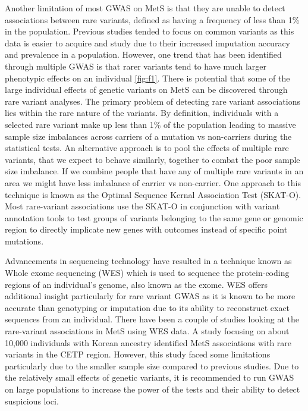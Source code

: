\documentclass[11pt]{article}
\begin{document}
Another limitation of most GWAS on MetS is that they are unable to detect associations between rare variants, defined as having a frequency of less than 1\% in the population. Previous studies tended to focus on common variants as this data is easier to acquire and study due to their increased imputation accuracy and prevalence in a population. However, one trend that has been identified through multiple GWAS is that rarer variants tend to have much larger phenotypic effects on an individual \ref{fig:f1}. There is potential that some of the large individual effects of genetic variants on MetS can be discovered through rare variant analyses. The primary problem of detecting rare variant associations lies within the rare nature of the variants. By definition, individuals with a selected rare variant make up less than 1\% of the population leading to massive sample size imbalances across carriers of a mutation vs non-carriers during the statistical tests. An alternative approach is to pool the effects of multiple rare variants, that we expect to behave similarly, together to combat the poor sample size imbalance. If we combine people that have any of multiple rare variants in an area we might have less imbalance of carrier vs non-carrier. One approach to this technique is known as the Optimal Sequence Kernal Association Test (SKAT-O). Most rare-variant associations use the SKAT-O in conjunction with variant annotation tools to test groups of variants belonging to the same gene or genomic region to directly implicate new genes with outcomes instead of specific point mutations. 

Advancements in sequencing technology have resulted in a technique known as Whole exome sequencing (WES) which is used to sequence the protein-coding regions of an individual's genome, also known as the exome. WES offers additional insight particularly for rare variant GWAS as it is known to be more accurate than genotyping or imputation due to its ability to reconstruct exact sequences from an individual. There have been a couple of studies looking at the rare-variant associations in MetS using WES data. A study focusing on about 10,000 individuals with Korean ancestry identified MetS associations with rare variants in the CETP region. However, this study faced some limitations particularly due to the smaller sample size compared to previous studies. Due to the relatively small effects of genetic variants, it is recommended to run GWAS on large populations to increase the power of the tests and their ability to detect suspicious loci.
\end{document}
